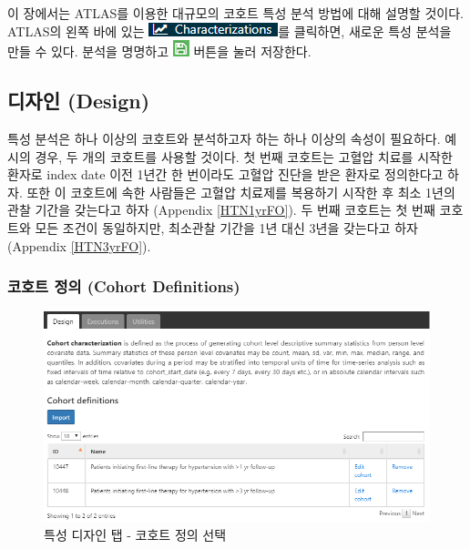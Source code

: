 \documentclass[11pt]{book}
\theoremstyle{definition}
\theoremstyle{definition}
\theoremstyle{definition}
\theoremstyle{remark}
\begin{document}
이 장에서는 ATLAS를 이용한 대규모의 코호트 특성 분석 방법에 대해 설명할
것이다. ATLAS의 왼쪽 바에 있는
\includegraphics{images/Characterization/atlasCharacterizationMenuItem.png}를
클릭하면, 새로운 특성 분석을 만들 수 있다. 분석을 명명하고
\includegraphics{images/PopulationLevelEstimation/save.png} 버튼을 눌러
저장한다.

\subsection{디자인 (Design)}\label{-design}

특성 분석은 하나 이상의 코호트와 분석하고자 하는 하나 이상의 속성이
필요하다. 예시의 경우, 두 개의 코호트를 사용할 것이다. 첫 번째 코호트는
고혈압 치료를 시작한 환자로 index date 이전 1년간 한 번이라도 고혈압
진단을 받은 환자로 정의한다고 하자. 또한 이 코호트에 속한 사람들은
고혈압 치료제를 복용하기 시작한 후 최소 1년의 관찰 기간을 갖는다고 하자
(Appendix \ref{HTN1yrFO}). 두 번째 코호트는 첫 번째 코호트와 모든 조건이
동일하지만, 최소관찰 기간을 1년 대신 3년을 갖는다고 하자 (Appendix
\ref{HTN3yrFO}).

\subsubsection*{코호트 정의 (Cohort
Definitions)}\label{--cohort-definitions}

\begin{figure}

{\centering \includegraphics[width=1\linewidth]{images/Characterization/atlasCharacterizationCohortSelection} 

}

\caption{특성 디자인 탭 - 코호트 정의 선택}\label{fig:atlasCharacterizationCohortSelection}
\end{figure}
\end{document}
